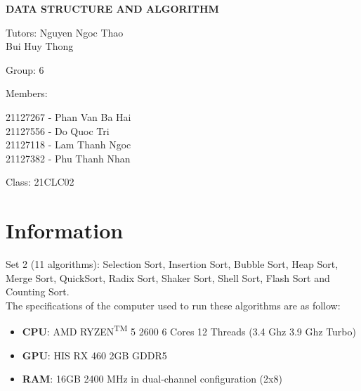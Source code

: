 \documentclass{article}
\begin{document}
\begin{titlepage}
\bigskip
\bigskip

\centerline{\LARGE{\textbf{DATA STRUCTURE AND ALGORITHM}}}
\raggedright
\bigskip
\bigskip

\LARGE{Tutors:
Nguyen Ngoc Thao\\
\hspace{1.8cm} Bui Huy Thong}
\bigskip

\LARGE{Group: 6}
\bigskip

\LARGE{Members:}
\bigskip

21127267 - Phan Van Ba Hai
\\

21127556 - Do Quoc Tri
\\

21127118 - Lam Thanh Ngoc
\\

21127382 - Phu Thanh Nhan
\bigskip

\LARGE{Class: 21CLC02}

\end{titlepage}




\pagestyle{fancy}
\fancyhf{}
\addtolength{\topmargin}{-0.70894pt}
\setlength{\headheight}{12.70894pt}

\rfoot{\textbf{\thepage}}




\tableofcontents

\pagebreak

\section{Information}
Set 2 (11 algorithms): Selection Sort, Insertion Sort, Bubble Sort, Heap Sort, Merge Sort, QuickSort, Radix Sort, Shaker Sort, Shell Sort, Flash Sort and Counting Sort. \\
The specifications of the computer used to run these algorithms are as follow:\\

\begin{itemize}
    \item \textbf{CPU}: AMD RYZEN\textsuperscript{TM} 5 2600 6 Cores 12 Threads (3.4 Ghz 3.9 Ghz Turbo)
    \item \textbf{GPU}: HIS RX 460 2GB GDDR5
    \item \textbf{RAM}: 16GB 2400 MHz in dual-channel configuration (2x8)
\end{itemize}
\end{document}
